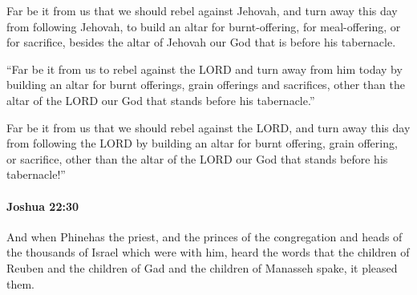 			\begin{versebox}
					\item[BHS] 
					\item[ASV] Far be it from us that we should rebel against Jehovah, and turn away this day from following Jehovah, to build an altar for burnt-offering, for meal-offering, or for sacrifice, besides the altar of Jehovah our God that is before his tabernacle.
					\item[NIV] “Far be it from us to rebel against the LORD and turn away from him today by building an altar for burnt offerings, grain offerings and sacrifices, other than the altar of the LORD our God that stands before his tabernacle.”
					\item[NRSV] Far be it from us that we should rebel against the LORD, and turn away this day from following the LORD by building an altar for burnt offering, grain offering, or sacrifice, other than the altar of the LORD our God that stands before his tabernacle!”
			\end{versebox}

		\paragraph{Joshua 22:30} %
			\label{JOSHUA-22-30}

			And when Phinehas the priest, and the princes of the congregation and heads of the thousands of Israel which were with him, heard the words that the children of Reuben and the children of Gad and the children of Manasseh spake, it pleased them.

